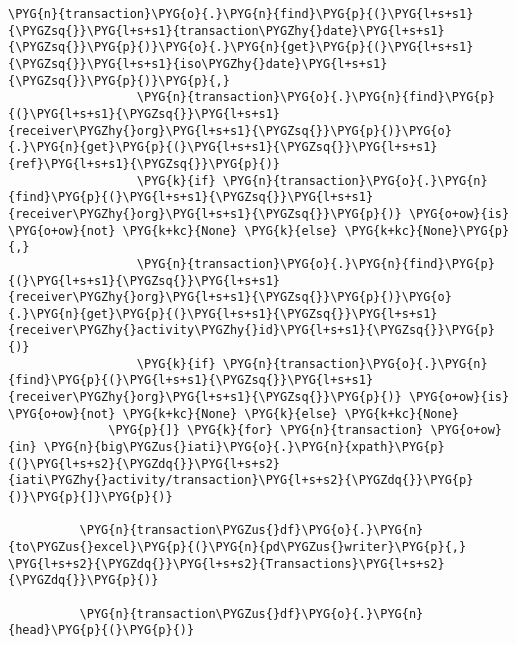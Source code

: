 \documentclass[letterpaper,10pt,english]{sphinxmanual}
\begin{document}
\begin{Verbatim}[commandchars=\\\{\}]
                  \PYG{n}{transaction}\PYG{o}{.}\PYG{n}{find}\PYG{p}{(}\PYG{l+s+s1}{\PYGZsq{}}\PYG{l+s+s1}{transaction\PYGZhy{}date}\PYG{l+s+s1}{\PYGZsq{}}\PYG{p}{)}\PYG{o}{.}\PYG{n}{get}\PYG{p}{(}\PYG{l+s+s1}{\PYGZsq{}}\PYG{l+s+s1}{iso\PYGZhy{}date}\PYG{l+s+s1}{\PYGZsq{}}\PYG{p}{)}\PYG{p}{,}
                  \PYG{n}{transaction}\PYG{o}{.}\PYG{n}{find}\PYG{p}{(}\PYG{l+s+s1}{\PYGZsq{}}\PYG{l+s+s1}{receiver\PYGZhy{}org}\PYG{l+s+s1}{\PYGZsq{}}\PYG{p}{)}\PYG{o}{.}\PYG{n}{get}\PYG{p}{(}\PYG{l+s+s1}{\PYGZsq{}}\PYG{l+s+s1}{ref}\PYG{l+s+s1}{\PYGZsq{}}\PYG{p}{)}
                  \PYG{k}{if} \PYG{n}{transaction}\PYG{o}{.}\PYG{n}{find}\PYG{p}{(}\PYG{l+s+s1}{\PYGZsq{}}\PYG{l+s+s1}{receiver\PYGZhy{}org}\PYG{l+s+s1}{\PYGZsq{}}\PYG{p}{)} \PYG{o+ow}{is} \PYG{o+ow}{not} \PYG{k+kc}{None} \PYG{k}{else} \PYG{k+kc}{None}\PYG{p}{,}
                  \PYG{n}{transaction}\PYG{o}{.}\PYG{n}{find}\PYG{p}{(}\PYG{l+s+s1}{\PYGZsq{}}\PYG{l+s+s1}{receiver\PYGZhy{}org}\PYG{l+s+s1}{\PYGZsq{}}\PYG{p}{)}\PYG{o}{.}\PYG{n}{get}\PYG{p}{(}\PYG{l+s+s1}{\PYGZsq{}}\PYG{l+s+s1}{receiver\PYGZhy{}activity\PYGZhy{}id}\PYG{l+s+s1}{\PYGZsq{}}\PYG{p}{)}
                  \PYG{k}{if} \PYG{n}{transaction}\PYG{o}{.}\PYG{n}{find}\PYG{p}{(}\PYG{l+s+s1}{\PYGZsq{}}\PYG{l+s+s1}{receiver\PYGZhy{}org}\PYG{l+s+s1}{\PYGZsq{}}\PYG{p}{)} \PYG{o+ow}{is} \PYG{o+ow}{not} \PYG{k+kc}{None} \PYG{k}{else} \PYG{k+kc}{None}
              \PYG{p}{]} \PYG{k}{for} \PYG{n}{transaction} \PYG{o+ow}{in} \PYG{n}{big\PYGZus{}iati}\PYG{o}{.}\PYG{n}{xpath}\PYG{p}{(}\PYG{l+s+s2}{\PYGZdq{}}\PYG{l+s+s2}{iati\PYGZhy{}activity/transaction}\PYG{l+s+s2}{\PYGZdq{}}\PYG{p}{)}\PYG{p}{]}\PYG{p}{)}
          
          \PYG{n}{transaction\PYGZus{}df}\PYG{o}{.}\PYG{n}{to\PYGZus{}excel}\PYG{p}{(}\PYG{n}{pd\PYGZus{}writer}\PYG{p}{,} \PYG{l+s+s2}{\PYGZdq{}}\PYG{l+s+s2}{Transactions}\PYG{l+s+s2}{\PYGZdq{}}\PYG{p}{)}
          
          \PYG{n}{transaction\PYGZus{}df}\PYG{o}{.}\PYG{n}{head}\PYG{p}{(}\PYG{p}{)}
\end{Verbatim}
\end{document}
